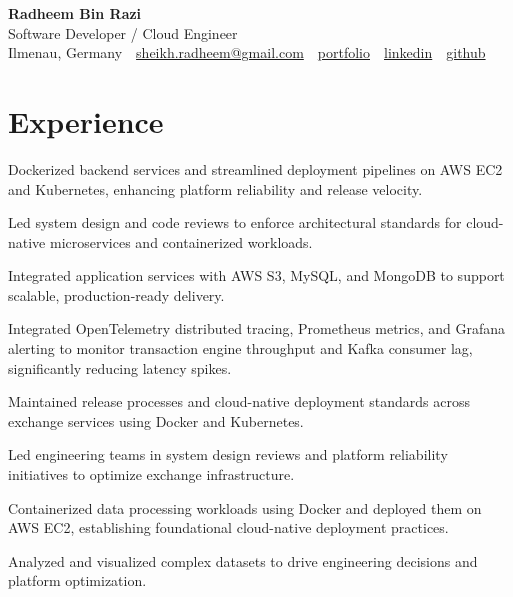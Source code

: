 \documentclass[10pt,a4paper]{resume}
\makeatletter
\newcommand{\Portfolio}{https://radheem.github.io/my-cv}
\newcommand{\PortfolioText}{portfolio}
\newcommand{\GitHub}{https://github.com/radheem}
\newcommand{\LinkedIn}{https://www.linkedin.com/in/radheem-razi}
\newcommand{\Email}{sheikh.radheem@gmail.com}
\makeatother
\begin{document}
\begin{center}
  {\huge\bfseries Radheem Bin Razi}\\[3pt]
  {\large Software Developer / Cloud Engineer}\\[6pt]
  \small
  Ilmenau, Germany \,\textbar\,
  \href{mailto:\Email}{\Email} \,\textbar\,
  \href{\Portfolio}{\PortfolioText} \,\textbar\,
  \href{\LinkedIn}{linkedin} \,\textbar\,
  \href{\GitHub}{github}
\end{center}
\vspace{2pt}

\section{Experience}

\bullets
  \item Dockerized backend services and streamlined deployment pipelines on AWS EC2 and Kubernetes, enhancing platform reliability and release velocity.
  \item Led system design and code reviews to enforce architectural standards for cloud-native microservices and containerized workloads.
  \item Integrated application services with AWS S3, MySQL, and MongoDB to support scalable, production-ready delivery.
\bulletsend
\vspace{1.5pt}
\bullets
  \item Integrated OpenTelemetry distributed tracing, Prometheus metrics, and Grafana alerting to monitor transaction engine throughput and Kafka consumer lag, significantly reducing latency spikes.
  \item Maintained release processes and cloud-native deployment standards across exchange services using Docker and Kubernetes.
  \item Led engineering teams in system design reviews and platform reliability initiatives to optimize exchange infrastructure.
\bulletsend
\vspace{1.5pt}
\bullets
  \item Containerized data processing workloads using Docker and deployed them on AWS EC2, establishing foundational cloud-native deployment practices.
  \item Analyzed and visualized complex datasets to drive engineering decisions and platform optimization.
\bulletsend
\vspace{1.5pt}
\end{document}
